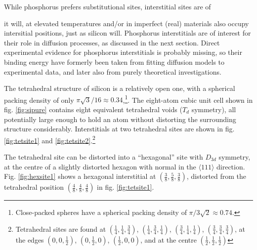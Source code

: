 \documentclass[11pt,bibliography=totoc,index=totoc]{scrbook}   %
\begin{document}
While phosphorus prefers substitutional sites, interstitial sites are of 

it will, at elevated temperatures and/or in imperfect (real) materials also occupy intersitial positions, just as silicon will.
Phosphorus interstitials are of interest for their role in diffusion processes, as discussed in the next section.
Direct experimental evidence for phosphorus interstitials is probably missing, so their binding energy have formerly been taken from fitting diffusion models to experimental data, and later also from purely theoretical investigations.\cite[391]{Pichler:2004}

The tetrahedral structure of silicon is a relatively open one, with a spherical packing density of only $\pi\sqrt{3}/16\approx 0.34$,\footnote{Close-packed spheres have a spherical packing density of $\pi/3\sqrt{2} \approx 0.74$.}.
The eight-atom cubic unit cell shown in fig. \ref{fig:sipure} contains eight equivalent tetrahedral voids ($T_d$ symmetry), all potentially large enough to hold an atom without distorting the surrounding structure considerably.
Interstitials at two tetrahedral sites are shown in fig. \ref{fig:tetsite1} and \ref{fig:tetsite2}.\footnote{Tetrahedral sites are found at
$(\frac{1}{4},\frac{1}{4},\frac{3}{4})$, 
$(\frac{1}{4},\frac{3}{4},\frac{1}{4})$, 
$(\frac{3}{4},\frac{1}{4},\frac{1}{4})$, 
$(\frac{3}{4},\frac{3}{4},\frac{3}{4})$, 
at the edges
$(0,0,\frac{1}{2})$,
$(0,\frac{1}{2},0)$,
$(\frac{1}{2},0,0)$,
and at the centre
$(\frac{1}{2},\frac{1}{2},\frac{1}{2})$}

The tetrahedral site can be distorted into a ``hexagonal'' site with $D_{3d}$ symmetry, 
at the centre of a slightly distorted hexagon with normal in the $\langle 111 \rangle$ direction. 
Fig. \ref{fig:hexsite1} shows a hexagonal interstitial at $(\frac{3}{8},\frac{5}{8},\frac{3}{8})$, 
distorted from the tetrahedral position $(\frac{4}{8},\frac{4}{8},\frac{4}{8})$ in fig. \ref{fig:tetsite1}.

\end{document}
